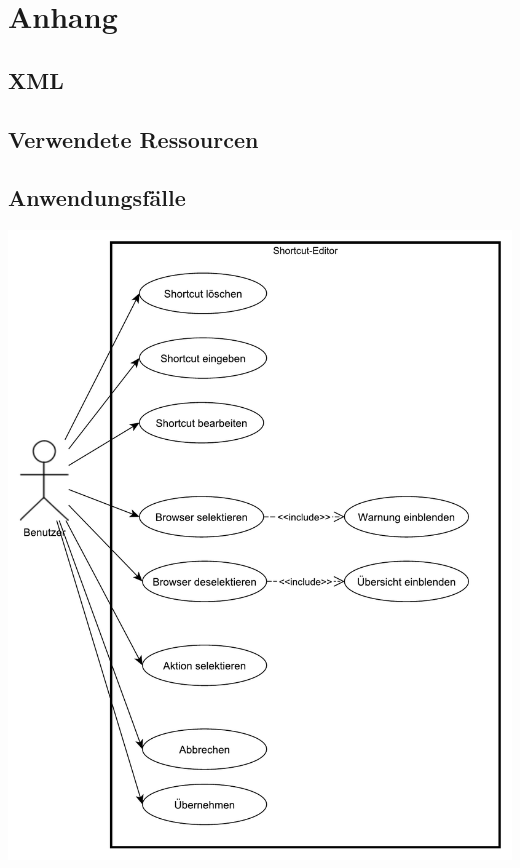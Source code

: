 \clearpage
\setcounter{page}{17}
\section{Anhang}
\subsection{XML}\label{xml}


\subsection{Verwendete Ressourcen}\label{ressources}


\subsection{Anwendungsfälle}\label{usecase}

\vfill
\includegraphics[width=\linewidth]{../graphic/diagrams/UC_Anwendungsfall/Anwendungsfall}
\vfill

